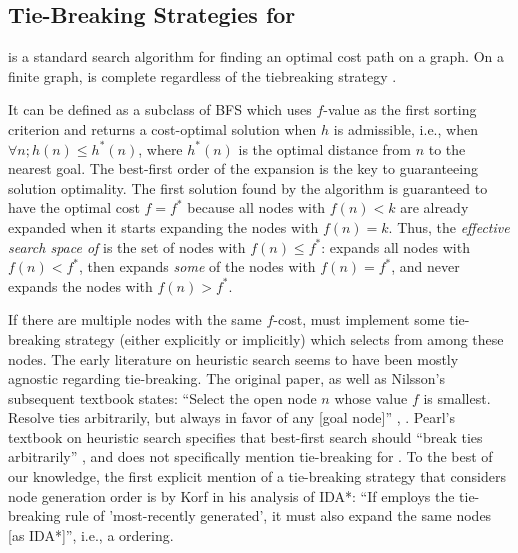 \subsection{Tie-Breaking Strategies for \astar}

\label{sec:astar-background}

\astar is a standard search algorithm for finding an optimal cost path
on a graph.
On a finite graph, \astar is
complete regardless of the tiebreaking strategy \cite{hart1968formal}.

It can be defined as a subclass of BFS which uses $f$-value as the first sorting criterion
and returns a cost-optimal solution when $h$ is admissible, i.e., when
$\forall n; h(n) \leq h^*(n)$, where $h^*(n)$ is the optimal distance from $n$ to
the nearest goal.
% 
The best-first order of the expansion is the key to guaranteeing solution optimality. 
The first solution found by the algorithm is guaranteed to have the optimal cost $f=f^*$ because 
all nodes with $f(n) < k$ are already expanded when it starts expanding
the nodes with $f(n) = k$.
Thus, the \emph{effective search space of \astar} is the set of nodes with 
$f(n) \leq f^*$: \astar expands all nodes with $f(n) < f^*$, then
expands \emph{some} of the nodes with $f(n) = f^*$, and
never expands the nodes with $f(n) > f^*$.

If there are multiple nodes with the same $f$-cost, \astar
must implement some tie-breaking strategy (either
explicitly or implicitly) which selects from among these nodes.
The early literature on heuristic search seems to have been mostly agnostic regarding tie-breaking.
The original \astar paper, as well as Nilsson's subsequent textbook 
states: ``Select the open node $n$ whose value $f$
is smallest. Resolve ties arbitrarily, but always in favor of any [goal
node]'' \cite[p.102 Step 2]{hart1968formal}, \cite[p.69]{Nilsson71}.
Pearl's textbook on heuristic search specifies that best-first search should ``break ties arbitrarily'' \cite[p.48, Step 3]{pearl1984heuristics}, and does not specifically mention tie-breaking for \astar.
To the best of our knowledge, the first explicit mention of a tie-breaking strategy that considers node generation order is by Korf in his analysis of IDA*: ``If \astar employs the tie-breaking rule of 'most-recently generated', it must also expand the same nodes [as IDA*]'', i.e., a \lifo ordering.


